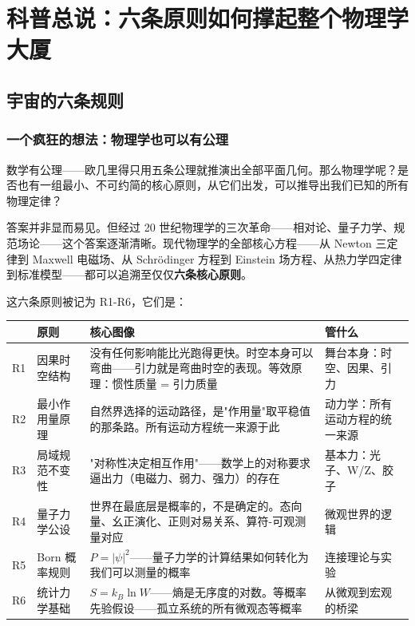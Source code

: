 \setcounter{chapter}{-1}
\chapter{科普总说：六条原则如何撑起整个物理学大厦}
\label{ch:prologue}

\section{宇宙的六条规则}

\subsection{一个疯狂的想法：物理学也可以有公理}

数学有公理——欧几里得只用五条公理就推演出全部平面几何。那么物理学呢？是否也有一组最小、不可约简的核心原则，从它们出发，可以推导出我们已知的所有物理定律？

答案并非显而易见。但经过 20 世纪物理学的三次革命——相对论、量子力学、规范场论——这个答案逐渐清晰。现代物理学的全部核心方程——从 Newton 三定律到 Maxwell 电磁场、从 Schr\"odinger 方程到 Einstein 场方程、从热力学四定律到标准模型——都可以追溯至仅仅\textbf{六条核心原则}。

这六条原则被记为 R1-R6，它们是：

\begin{center}
\small
\begin{tabular}{p{0.4cm}p{3.2cm}p{5cm}p{6cm}}
\toprule
  & \textbf{原则} & \textbf{核心图像} & \textbf{管什么} \\
\midrule
R1 & 因果时空结构 & 没有任何影响能比光跑得更快。时空本身可以弯曲——引力就是弯曲时空的表现。等效原理：惯性质量 = 引力质量 & 舞台本身：时空、因果、引力 \\
R2 & 最小作用量原理 & 自然界选择的运动路径，是"作用量"取平稳值的那条路。所有运动方程统一来源于此 & 动力学：所有运动方程的统一来源 \\
R3 & 局域规范不变性 & "对称性决定相互作用"——数学上的对称要求逼出力（电磁力、弱力、强力）的存在 & 基本力：光子、W/Z、胶子 \\
R4 & 量子力学公设 & 世界在最底层是概率的，不是确定的。态向量、幺正演化、正则对易关系、算符-可观测量对应 & 微观世界的逻辑 \\
R5 & Born 概率规则 & $P = |\psi|^2$——量子力学的计算结果如何转化为我们可以测量的概率 & 连接理论与实验 \\
R6 & 统计力学基础 & $S = k_B \ln W$——熵是无序度的对数。等概率先验假设——孤立系统的所有微观态等概率 & 从微观到宏观的桥梁 \\
\bottomrule
\end{tabular}
\end{center}

